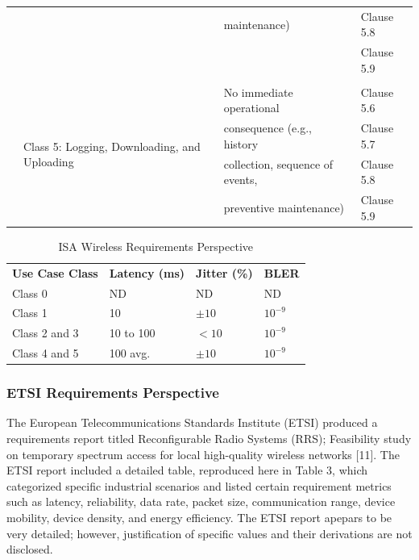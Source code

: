 \begin{table}[!tb]
\begin{adjustbox}{width=\columnwidth,center}
\begin{tabular}{|l|l|p{10.645em}|p{10em}|}
		&       & maintenance)  & Clause 5.8  \\
		&       & \multicolumn{1}{l|}{} & Clause 5.9  \\
		&       & \multicolumn{1}{l|}{} & \multicolumn{1}{l|}{} \\
		\cmidrule{2-4}      & \multicolumn{1}{l|}{\multirow{4}[2]{*}{Class 5:  Logging, Downloading, and Uploading}} & No immediate operational  & Clause 5.6  \\
		&       & consequence (e.g., history  & Clause 5.7  \\
		&       & collection, sequence of events,  & Clause 5.8  \\
		&       & preventive maintenance)  & Clause 5.9  \\
		\bottomrule
	\end{tabular}%

	\end{adjustbox}

	\label{soa:isa-classes}%
\end{table}%


\begin{table}[!tb]
	\centering
	\caption{ISA Wireless Requirements Perspective}
	\label{soa:isa-reqts-persp}%

	\begin{tabular}{|p{10.57em}|p{5.855em}|p{5.855em}|p{5.855em}|}
		\toprule
		\textbf{Use Case Class} & \textbf{Latency (ms)} & \textbf{Jitter (\%)} & \textbf{BLER} \\
		Class 0 & ND    & ND    & ND \\
		\midrule
		Class 1 & \multicolumn{1}{l|}{10} & $\pm10$ & $10^{-9}$ \\
		\midrule
		Class 2 and 3 & 10 to 100 & $<10$ & $10^{-9}$ \\
		\midrule
		Class 4 and 5 & 100 avg. & $\pm10$ & $10^{-9}$ \\
		\bottomrule
	\end{tabular}%
\end{table}%


\subsubsection{ETSI Requirements Perspective}\label{sec:litreview:etsi}

The European Telecommunications Standards Institute (ETSI) produced a requirements report titled Reconfigurable Radio Systems (RRS); Feasibility study on temporary spectrum access for local high-quality wireless networks [11]. The ETSI report included a detailed table, reproduced here in Table 3, which categorized specific industrial scenarios and listed certain requirement metrics such as latency, reliability, data rate, packet size, communication range, device mobility, device density, and energy efficiency. The ETSI report apepars to be very detailed; however, justification of specific values and their derivations are not disclosed.

